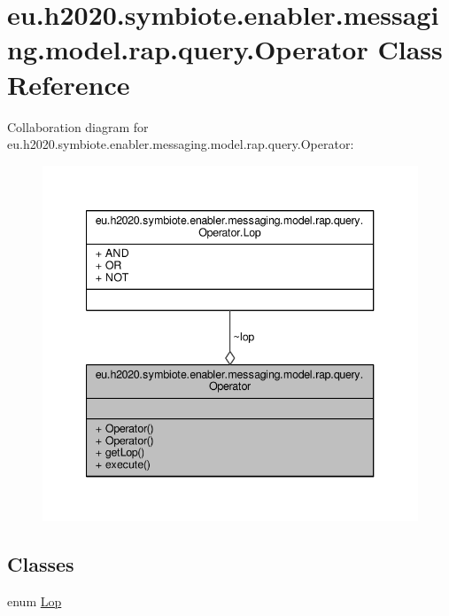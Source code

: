 \hypertarget{classeu_1_1h2020_1_1symbiote_1_1enabler_1_1messaging_1_1model_1_1rap_1_1query_1_1Operator}{}\section{eu.\+h2020.\+symbiote.\+enabler.\+messaging.\+model.\+rap.\+query.\+Operator Class Reference}
\label{classeu_1_1h2020_1_1symbiote_1_1enabler_1_1messaging_1_1model_1_1rap_1_1query_1_1Operator}


Collaboration diagram for eu.\+h2020.\+symbiote.\+enabler.\+messaging.\+model.\+rap.\+query.\+Operator\+:
\nopagebreak
\begin{figure}[H]
\begin{center}
\leavevmode
\includegraphics[width=340pt]{classeu_1_1h2020_1_1symbiote_1_1enabler_1_1messaging_1_1model_1_1rap_1_1query_1_1Operator__coll__graph}
\end{center}
\end{figure}
\subsection*{Classes}
\begin{DoxyCompactItemize}
\item 
enum \hyperlink{enumeu_1_1h2020_1_1symbiote_1_1enabler_1_1messaging_1_1model_1_1rap_1_1query_1_1Operator_1_1Lop}{Lop}
\end{DoxyCompactItemize}
